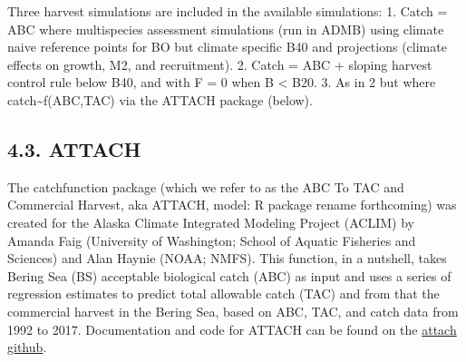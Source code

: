 \documentclass[]{article}
\begin{document}
Three harvest simulations are included in the available simulations: 1.
Catch = ABC where multispecies assessment simulations (run in ADMB)
using climate naive reference points for BO but climate specific B40 and
projections (climate effects on growth, M2, and recruitment). 2. Catch =
ABC + sloping harvest control rule below B40, and with F = 0 when B
\textless{} B20. 3. As in 2 but where catch\textasciitilde{}f(ABC,TAC)
via the ATTACH package (below).

\subsection{4.3. ATTACH}\label{attach}

The catchfunction package (which we refer to as the ABC To TAC and
Commercial Harvest, aka ATTACH, model: R package rename forthcoming) was
created for the Alaska Climate Integrated Modeling Project (ACLIM) by
Amanda Faig (University of Washington; School of Aquatic Fisheries and
Sciences) and Alan Haynie (NOAA; NMFS). This function, in a nutshell,
takes Bering Sea (BS) acceptable biological catch (ABC) as input and
uses a series of regression estimates to predict total allowable catch
(TAC) and from that the commercial harvest in the Bering Sea, based on
ABC, TAC, and catch data from 1992 to 2017. Documentation and code for
ATTACH can be found on the
\href{\%22https://github.com/amandafaig/catchfunction\%22}{attach
github}.
\end{document}
